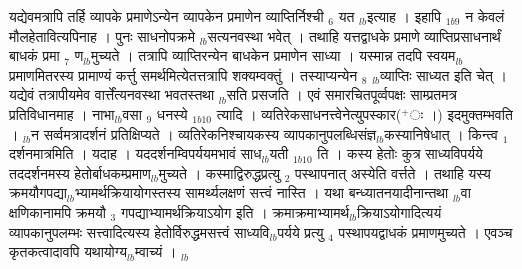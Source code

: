 \documentclass[article,12pt,a4paper]{memoir}%
\newcommand{\add}[1]{($^{+}$#1)}
\newcounter{parCount}
\begin{document}
	  
	  \pstart \leavevmode%
	यद्येवमत्रापि तर्हि व्यापके प्रमाणेऽन्येन व्यापकेन प्रमाणेन व्याप्तिर्निश्ची {\tiny $_{6}$} यत {\tiny $_{lb}$}इत्याह । {\color{DodgerBlue3}इहापि} {\tiny $_{1b9}$} न केवलं मौलहेतावित्यपिनाह । पुनः साधनोपक्रमे {\tiny $_{lb}$}सत्यनवस्था भवेत् । तथाहि यत्तद्वाधके प्रमाणे व्याप्तिप्रसाधनार्थं बाधकं प्रमा {\tiny $_{7}$} ण{\tiny $_{lb}$}मुच्यते । तत्रापि व्याप्तिरन्येन बाधकेन प्रमाणेन साध्या । यस्मान्न तदपि स्वयम{\tiny $_{lb}$}प्रमाणमितरस्य प्रामाण्यं कर्त्तु समर्थमित्येतत्तत्रापि शक्यम्वक्तुं । तस्याप्यन्येन {\tiny $_{8}$} {\tiny $_{lb}$}व्याप्तिः साध्यत इति चेत् । यद्येवं तत्रापीयमेव वार्त्तेंत्यनवस्था भवतस्तथा {\tiny $_{lb}$}सति प्रसजति । एवं समारचितपूर्व्वपक्षः साम्प्रतमत्र प्रतिविधानमाह । {\color{DodgerBlue3}नाभा{\tiny $_{lb}$}वसा {\tiny $_{9}$} \leavevmode{} धनस्ये} {\tiny $_{1b10}$} त्यादि । व्यतिरेकसाधनत्त्वेनेत्युपस्कार\add{ः ।} इदमुक्तम्भवति । {\tiny $_{lb}$}न सर्व्वमत्रादर्शनं प्रतिक्षिप्यते । व्यतिरेकनिश्चायकस्य व्यापकानुपलब्धिसंज्ञ{\tiny $_{lb}$}कस्यानिषेधात् । किन्त्व {\tiny $_{1}$} दर्शनमात्रमिति । यदाह । {\color{DodgerBlue3}यददर्शनम्विपर्ययमभावं साध{\tiny $_{lb}$}यती} {\tiny $_{1b10}$} {\color{DodgerBlue3}ति} । कस्य हेतोः कुत्र साध्यविपर्यये तददर्शनमस्य हेतोर्बाधकम्प्रमाण{\tiny $_{lb}$}मुच्यते । कस्माद्विरुद्धप्रत्यु {\tiny $_{2}$} पस्थापनात् अस्येति वर्त्तते । तथाहि यस्य क्रमयौगपद्या{\tiny $_{lb}$}भ्यामर्थक्रियायोगस्तस्य सामर्थ्यलक्षणं सत्त्वं नास्ति । यथा बन्ध्यातनयादीनान्तथा {\tiny $_{lb}$}वा क्षणिकानामपि क्रमयौ {\tiny $_{3}$} गपद्याभ्यामर्थक्रियाऽयोग इति । क्रमाक्रमाभ्यामर्थ{\tiny $_{lb}$}क्रियाऽयोगादित्ययं व्यापकानुपलम्भः सत्त्वादित्यस्य हेतोर्विरुद्धमसत्त्वं साध्यवि{\tiny $_{lb}$}पर्यये प्रत्यु {\tiny $_{4}$} पस्थापयद्वाधकं प्रमाणमुच्यते । एवञ्च कृतकत्वादावपि यथायोग्य{\tiny $_{lb}$}म्वाच्यं ।
	{}
	\pend%
      {\tiny $_{lb}$}
\end{document}
